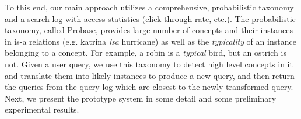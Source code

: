 

To this end, our main approach utilizes a comprehensive,
probabilistic taxonomy and a search log with access statistics (click-through
rate, etc.). The probabilistic taxonomy, called Probase\cite{wu2012probase},
provides large number of concepts and their instances in is-a relations (e.g.
katrina {\em isa} hurricane) as well as the {\em typicality} of an instance
belonging to a concept. For example, a robin is a {\em typical} bird, but
an ostrich is not. Given a user query, we use this taxonomy to
detect high level concepts in it and translate them into likely instances
to produce a new query, and then return the queries from the query log
which are closest to the newly transformed query.
Next, we present the prototype system in some detail and some preliminary
experimental results.
%

